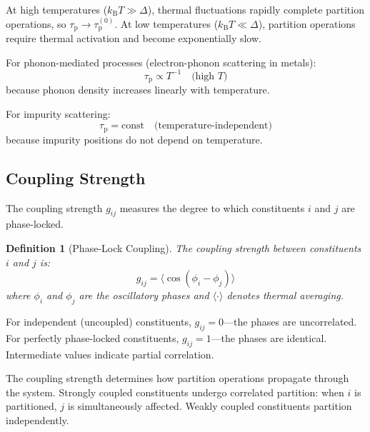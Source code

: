\documentclass[twocolumn,10pt,aps,prd,superscriptaddress,nofootinbib]{revtex4-2}
\newtheorem{definition}[theorem]{Definition}
\theoremstyle{remark}
\newcommand{\kB}{k_{\mathrm{B}}}
\newcommand{\tauP}{\tau_{\mathrm{p}}}
\newcommand{\Gij}{g_{ij}}
\begin{document}
At high temperatures ($\kB T \gg \Delta$), thermal fluctuations rapidly complete partition operations, so $\tauP \to \tauP^{(0)}$. At low temperatures ($\kB T \ll \Delta$), partition operations require thermal activation and become exponentially slow.

For phonon-mediated processes (electron-phonon scattering in metals):
\begin{equation}
\tauP \propto T^{-1} \quad \text{(high } T\text{)}
\label{eq:phonon_lag}
\end{equation}
because phonon density increases linearly with temperature.

For impurity scattering:
\begin{equation}
\tauP = \text{const} \quad \text{(temperature-independent)}
\label{eq:impurity_lag}
\end{equation}
because impurity positions do not depend on temperature.

\subsection{Coupling Strength}

The coupling strength $\Gij$ measures the degree to which constituents $i$ and $j$ are phase-locked.

\begin{definition}[Phase-Lock Coupling]
\label{def:coupling}
The coupling strength between constituents $i$ and $j$ is:
\begin{equation}
\Gij = \langle \cos(\phi_i - \phi_j) \rangle
\label{eq:coupling_definition}
\end{equation}
where $\phi_i$ and $\phi_j$ are the oscillatory phases and $\langle \cdot \rangle$ denotes thermal averaging.
\end{definition}

For independent (uncoupled) constituents, $\Gij = 0$---the phases are uncorrelated. For perfectly phase-locked constituents, $\Gij = 1$---the phases are identical. Intermediate values indicate partial correlation.

The coupling strength determines how partition operations propagate through the system. Strongly coupled constituents undergo correlated partition: when $i$ is partitioned, $j$ is simultaneously affected. Weakly coupled constituents partition independently.

\end{document}

